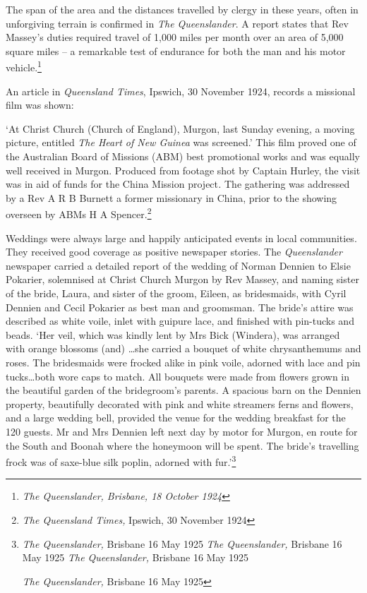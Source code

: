 The span of the area and the distances travelled by clergy in these years, often in unforgiving terrain is confirmed in \emph{The Queenslander}. A report states that Rev Massey's duties required travel of 1,000 miles per month over an area of 5,000 square miles -- a remarkable test of endurance for both the man and his motor vehicle.\footnote{\emph{The Queenslander, Brisbane, 18 October 1924}}

An article in \emph{Queensland Times}, Ipswich, 30 November 1924, records a missional film was shown:

`At Christ Church (Church of England), Murgon, last Sunday evening, a moving picture, entitled \emph{The Heart of New Guinea} was screened.' This film proved one of the Australian Board of Missions (ABM) best promotional works and was equally well received in Murgon. Produced from footage shot by Captain Hurley, the visit was in aid of funds for the China Mission project\emph{.} The gathering was addressed by a Rev A R B Burnett a former missionary in China, prior to the showing overseen by ABMs H A Spencer.\footnote{\emph{The Queensland Times,} Ipswich, 30 November 1924}

Weddings were always large and happily anticipated events in local communities. They received good coverage as positive newspaper stories. The \emph{Queenslander} newspaper carried a detailed report of the wedding of Norman Dennien to Elsie Pokarier, solemnised at Christ Church Murgon by Rev Massey, and naming sister of the bride, Laura, and sister of the groom, Eileen, as bridesmaids, with Cyril Dennien and Cecil Pokarier as best man and groomsman. The bride's attire was described as white voile, inlet with guipure lace, and finished with pin-tucks and beads. `Her veil, which was kindly lent by Mrs Bick (Windera), was arranged with orange blossoms (and) \ldots she carried a bouquet of white chrysanthemums and roses. The bridesmaids were frocked alike in pink voile, adorned with lace and pin tucks\ldots both wore caps to match. All bouquets were made from flowers grown in the beautiful garden of the bridegroom's parents. A spacious barn on the Dennien property, beautifully decorated with pink and white streamers ferns and flowers, and a large wedding bell, provided the venue for the wedding breakfast for the 120 guests. Mr and Mrs Dennien left next day by motor for Murgon, en route for the South and Boonah where the honeymoon will be spent. The bride's travelling frock was of saxe-blue silk poplin, adorned with fur.'\footnote{\emph{The Queenslander,} Brisbane 16 May 1925 \emph{The Queenslander,} Brisbane 16 May 1925 \emph{The Queenslander,} Brisbane 16 May 1925

  \emph{The Queenslander,} Brisbane 16 May 1925}

